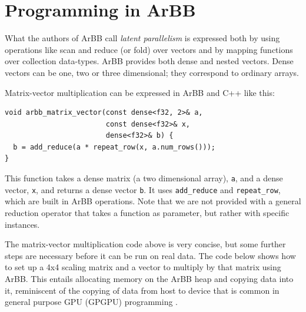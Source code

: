 \section{Programming in ArBB}
\label{sec:ProgrammingArBB}

What the authors of ArBB call {\em latent parallelism} is expressed both
by using operations like scan and reduce (or fold) over vectors and by
mapping functions over collection data-types.
ArBB provides both dense and nested vectors. 
Dense vectors can be one, two or three dimensional; they correspond
to ordinary arrays.


Matrix-vector multiplication can be expressed in ArBB and C++ like this: 
\begin{Verbatim}[samepage=true] 
void arbb_matrix_vector(const dense<f32, 2>& a, 
                        const dense<f32>& x,
                        dense<f32>& b) {
  b = add_reduce(a * repeat_row(x, a.num_rows()));
}
\end{Verbatim} 
\noindent
This function takes a dense matrix (a two dimensional array), {\tt a}, and a dense vector, {\tt x},
and returns a dense vector {\tt b}.
It
uses {\tt add\_reduce} and {\tt repeat\_row}, which are built in ArBB 
operations. Note that we are not provided with a general reduction operator
that takes a function as parameter,
but rather with specific instances.


The matrix-vector multiplication code above is very concise, but some further
steps are necessary before it can be run on real data. The code 
below shows how to set up a 4x4 scaling matrix and a vector to 
multiply by that matrix using ArBB. This entails allocating 
memory on the ArBB heap and copying data into it, reminiscent of the copying of
data from
host to 
device that is common in general purpose GPU (GPGPU) programming . 

